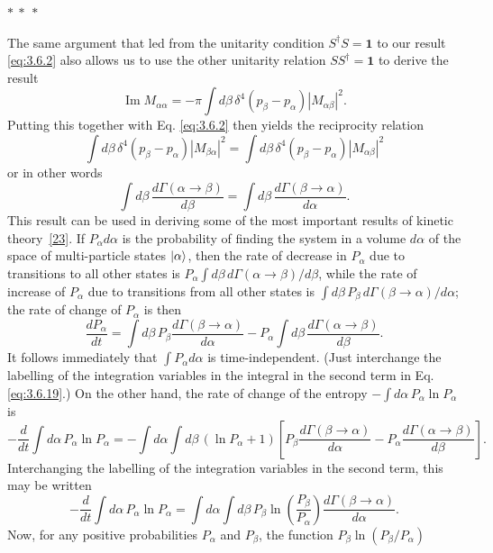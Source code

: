 \begin{center}
$*\ *\ *$
\end{center}

The same argument that led from the unitarity condition $S^\dagger S=\mathbf{1}$ to our result
\eqref{eq:3.6.2} also allows us to use the other unitarity relation $SS^\dagger=\mathbf{1}$ to derive the
result
\begin{equation}
 \operatorname{Im}M_{\alpha\alpha}
 =-\pi\int d\beta\,\delta^4(p_\beta-p_\alpha)|M_{\alpha\beta}|^2.
 \tag{3.6.16}\label{eq:3.6.16}
\end{equation}
Putting this together with Eq. \eqref{eq:3.6.2} then yields the reciprocity relation
\begin{equation}
 \int d\beta\,\delta^4(p_\beta-p_\alpha)|M_{\beta\alpha}|^2
 =\int d\beta\,\delta^4(p_\beta-p_\alpha)|M_{\alpha\beta}|^2
 \tag{3.6.17}\label{eq:3.6.17}
\end{equation}
or in other words
\begin{equation}
 \int d\beta\,\frac{d\Gamma(\alpha\to\beta)}{d\beta}
 =\int d\beta\,\frac{d\Gamma(\beta\to\alpha)}{d\alpha}.
 \tag{3.6.18}\label{eq:3.6.18}
\end{equation}
This result can be used in deriving some of the most important results of kinetic theory~\hyperref[ref:3.23]{[23]}.
If $P_\alpha d\alpha$ is the probability of finding the system in a volume $d\alpha$ of the space
of multi-particle states $\lvert \alpha\rangle$, then the rate of decrease in $P_\alpha$ due to transitions
to all other states is $P_\alpha\int d\beta\,d\Gamma(\alpha\to\beta)/d\beta$, while the rate of
increase of $P_\alpha$ due to transitions from all other states is
$\int d\beta\,P_\beta\,d\Gamma(\beta\to\alpha)/d\alpha$; the rate of change of $P_\alpha$ is then
\begin{equation}
 \frac{dP_\alpha}{dt}=\int d\beta\,P_\beta\frac{d\Gamma(\beta\to\alpha)}{d\alpha}
 -P_\alpha\int d\beta\,\frac{d\Gamma(\alpha\to\beta)}{d\beta}.
 \tag{3.6.19}\label{eq:3.6.19}
\end{equation}
It follows immediately that $\int P_\alpha d\alpha$ is time-independent. (Just interchange the
labelling of the integration variables in the integral in the second term in Eq. \eqref{eq:3.6.19}.)
On the other hand, the rate of change of the entropy $-\int d\alpha\,P_\alpha\ln P_\alpha$ is
\[
 -\frac{d}{dt}\int d\alpha\,P_\alpha\ln P_\alpha
 =-\int d\alpha\int d\beta\,(\ln P_\alpha+1)
 \left[P_\beta\frac{d\Gamma(\beta\to\alpha)}{d\alpha}
 -P_\alpha\frac{d\Gamma(\alpha\to\beta)}{d\beta}\right].
\]
Interchanging the labelling of the integration variables in the second term, this may be written
\[
 -\frac{d}{dt}\int d\alpha\,P_\alpha\ln P_\alpha
 =\int d\alpha\int d\beta\,P_\beta\ln\left(\frac{P_\beta}{P_\alpha}\right)
 \frac{d\Gamma(\beta\to\alpha)}{d\alpha}.
\]
Now, for any positive probabilities $P_\alpha$ and $P_\beta$, the function
$P_\beta\ln(P_\beta/P_\alpha)$
